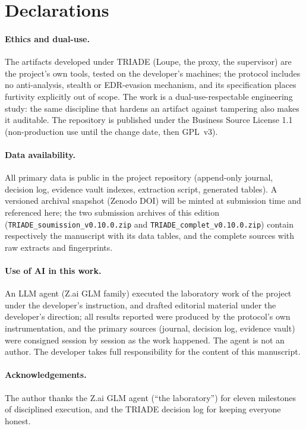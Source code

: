 \documentclass[11pt,a4paper]{article}
\newcommand{\code}[1]{\texttt{\small #1}}
\begin{document}
\section*{Declarations}

\paragraph{Ethics and dual-use.} The artifacts developed under TRIADE
(Loupe, the proxy, the supervisor) are the project's own tools, tested on
the developer's machines; the protocol includes no anti-analysis,
stealth or EDR-evasion mechanism, and its specification places furtivity
explicitly out of scope. The work is a dual-use-respectable engineering
study: the same discipline that hardens an artifact against tampering
also makes it auditable. The repository is published under the Business
Source License 1.1 (non-production use until the change date, then
GPL~v3).

\paragraph{Data availability.} All primary data is public in the project
repository (append-only journal, decision log, evidence vault indexes,
extraction script, generated tables). A versioned archival snapshot
(Zenodo DOI) will be minted at submission time and referenced here; the
two submission archives of this edition (\code{TRIADE\_soumission\_v0.10.0.zip}
and \code{TRIADE\_complet\_v0.10.0.zip}) contain respectively the
manuscript with its data tables, and the complete sources with raw
extracts and fingerprints.

\paragraph{Use of AI in this work.} An LLM agent (Z.ai GLM family)
executed the laboratory work of the project under the developer's
instruction, and drafted editorial material under the developer's
direction; all results reported were produced by the protocol's own
instrumentation, and the primary sources (journal, decision log,
evidence vault) were consigned session by session as the work happened.
The agent is not an author. The developer takes full responsibility for
the content of this manuscript.

\paragraph{Acknowledgements.} The author thanks the Z.ai GLM agent
(``the laboratory'') for eleven milestones of disciplined execution, and
the TRIADE decision log for keeping everyone honest.


\end{document}
